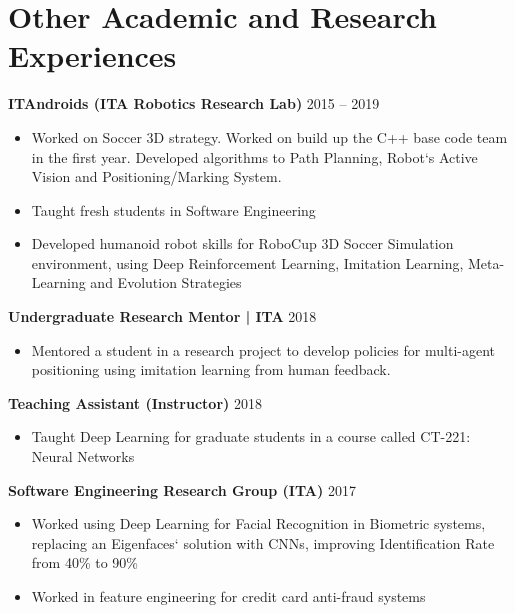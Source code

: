 \documentclass[11pt,letter,sans,colorlinks,linkcolor=true]{moderncv}
\begin{document}
\section{Other Academic and Research Experiences}
    \textbf{ITAndroids (ITA Robotics Research Lab)}
    \hfill 2015 -- 2019 \par
    \begin{itemize}
\item[\textbullet]{Worked on Soccer 3D strategy. Worked on build up the C++ base code team in the first year. Developed algorithms to Path Planning, Robot`s Active Vision and Positioning/Marking System.}
\item[\textbullet]{Taught fresh students in Software Engineering}
\item[\textbullet]{Developed humanoid robot skills for RoboCup 3D Soccer Simulation environment, using Deep Reinforcement Learning, Imitation Learning, Meta-Learning and Evolution Strategies}
    \end{itemize}
  \vspace{3mm}
    \textbf{Undergraduate Research Mentor | ITA}
    \hfill 2018 \par
    \begin{itemize}
\item[\textbullet]{Mentored a student in a research project to develop policies for multi-agent positioning using imitation learning from human feedback.}
    \end{itemize}
  \vspace{3mm}
    \textbf{Teaching Assistant (Instructor)}
    \hfill 2018 \par
    \begin{itemize}
\item[\textbullet]{Taught Deep Learning for graduate students in a course called CT-221: Neural Networks}
    \end{itemize}
  \vspace{3mm}
    \textbf{Software Engineering Research Group (ITA)}
    \hfill 2017 \par
    \begin{itemize}
\item[\textbullet]{Worked using Deep Learning for Facial Recognition in Biometric systems, replacing an Eigenfaces` solution with CNNs, improving Identification Rate from 40\% to 90\%}
\item[\textbullet]{Worked in feature engineering for credit card anti-fraud systems}
    \end{itemize}
\end{document}
